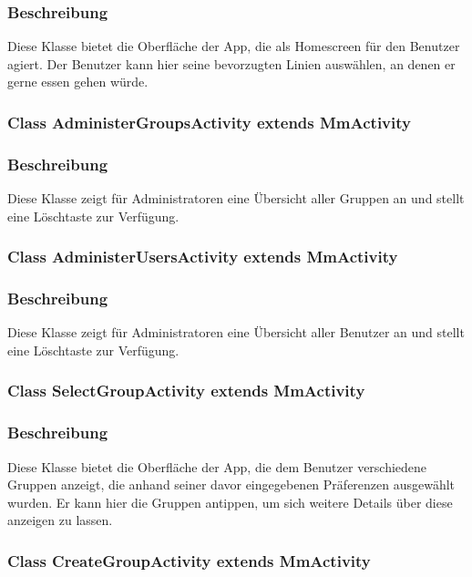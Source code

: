 \documentclass[a4paper]{scrreprt}
\begin{document}
\subsubsection*{Beschreibung}
Diese Klasse bietet die Oberfläche der App, die als \Gls{Homescreen} für den Benutzer agiert. Der Benutzer kann hier seine bevorzugten Linien auswählen, an denen er gerne essen gehen würde.


\subsubsection{Class AdministerGroupsActivity extends MmActivity}
\subsubsection*{Beschreibung}
Diese Klasse zeigt für Administratoren eine Übersicht aller Gruppen an und stellt eine Löschtaste zur Verfügung. 


\subsubsection{Class AdministerUsersActivity extends MmActivity}
\subsubsection*{Beschreibung}
Diese Klasse zeigt für Administratoren eine Übersicht aller Benutzer an und stellt eine Löschtaste zur Verfügung.


\subsubsection{Class SelectGroupActivity extends MmActivity}
\subsubsection*{Beschreibung}
Diese Klasse bietet die Oberfläche der App, die dem Benutzer verschiedene Gruppen anzeigt, die anhand seiner davor eingegebenen Präferenzen ausgewählt wurden. Er kann hier die Gruppen antippen, um sich weitere Details über diese anzeigen zu lassen.


\subsubsection{Class CreateGroupActivity extends MmActivity}
\end{document}
